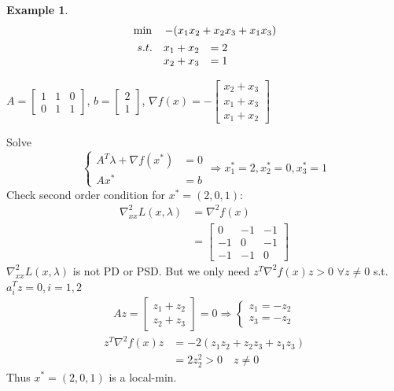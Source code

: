 \documentclass[11pt,a4paper]{article}
\newtheorem{example}{Example}
\begin{document}
\begin{example}
    \begin{align*}
        &\min\quad -(x_1x_2+x_2x_3+x_1x_3)\\
        &\begin{array}{r@{\quad}r@{}l@{\quad}l}
        s.t.\quad 
        x_1+x_2&=2\\
        x_2+x_3&=1
    \end{array}
    \end{align*}
\end{example}
$A=\begin{bmatrix}
    1&	1&0\\
    0&	1&1
\end{bmatrix}$, $b=\begin{bmatrix}
    2\\
    1
\end{bmatrix}$, $\nabla f(x)=-\begin{bmatrix}
    x_2+x_3\\
    x_1+x_3\\
    x_1+x_2
\end{bmatrix}$

Solve $$\left\{\begin{matrix}
    A^T\lambda+\nabla f(x^*)&=0\\
    Ax^*&=b
\end{matrix}\right. \Rightarrow	x_1^*=2,x_2^*=0,x_3^*=1$$
Check second order condition for $x^*=(2,0,1)$:
\begin{equation}
    \begin{aligned}
        \nabla^2_{xx} L(x,\lambda)&=\nabla^2 f(x)\\
        &=\begin{bmatrix}
            0&-1&-1\\
            -1&0&-1\\
            -1&-1&0
        \end{bmatrix}
    \end{aligned}
    \nonumber
\end{equation}
$\nabla^2_{xx} L(x,\lambda)$ is not PD or PSD. But we only need $z^T\nabla^2 f(x)z>0$ $\forall z\neq 0$ s.t. $a_i^Tz=0,i=1,2$
\begin{equation}
    \begin{aligned}
        Az=\begin{bmatrix}
            z_1+z_2\\
            z_2+z_3
        \end{bmatrix}=0 \Rightarrow	\left\{\begin{matrix}
            z_1=-z_2\\
            z_3=-z_2
        \end{matrix}\right.
    \end{aligned}
    \nonumber
\end{equation}
\begin{equation}
    \begin{aligned}
        z^T\nabla^2 f(x)z&=-2(z_1z_2+z_2z_3+z_1z_3)\\
        &=2z_2^2>0\quad z\neq0
    \end{aligned}
    \nonumber
\end{equation}
Thus $x^*=(2,0,1)$ is a local-min.
\end{document}
